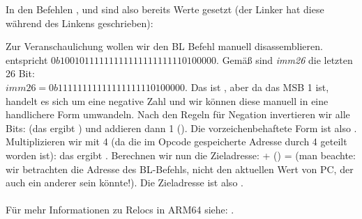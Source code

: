 In den Befehlen , \ADD und  sind also bereits Werte gesetzt (der Linker hat diese während des Linkens
geschrieben):



Zur Veranschaulichung wollen wir den BL Befehl manuell disassemblieren.\\
 entspricht $0b10010111111111111111111110100000$.
Gemäß  sind \emph{imm26} die letzten 26 Bit:\\
$imm26 = 0b11111111111111111110100000$.
Das ist , aber da das MSB 1 ist, handelt es sich um eine negative Zahl und wir können diese manuell in
eine handlichere Form umwandeln.
Nach den Regeln für Negation invertieren wir alle Bits: (das ergibt
) und addieren dann 1 ().
Die vorzeichenbehaftete Form ist also .
Multiplizieren wir  mit 4 (da die im Opcode gespeicherte Adresse durch 4 geteilt worden ist): das ergibt
. 
Berechnen wir nun die Zieladresse:  + () =  (man beachte: wir betrachten die
Adresse des BL-Befehls, nicht den aktuellen Wert von \ac{PC}, der auch ein anderer sein könnte!).
Die Zieladresse ist also .\\\\
Für mehr Informationen zu Relocs in ARM64 siehe: \ARMELF.
